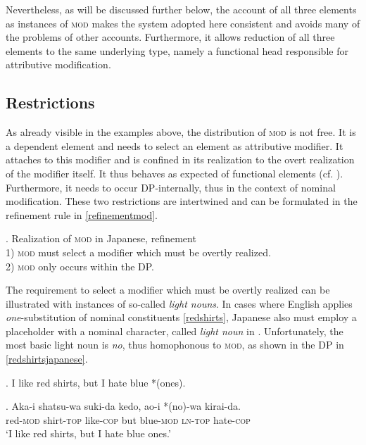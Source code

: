 Nevertheless, as will be discussed further below, the account of all three elements as instances of \textsc{mod} makes the system adopted here consistent and avoids many of the problems of other accounts. Furthermore, it allows reduction of all three elements to the same underlying type, namely a functional head responsible for attributive modification.

\subsection{Restrictions}

As already visible in the examples above, the distribution of \textsc{mod} is not free. It is a dependent element and needs to select an element as attributive modifier. It attaches to this modifier and is confined in its realization to the overt realization of the modifier itself. It thus behaves as expected of functional elements (cf. \citealt[§ 2.2.2]{rubin:1994:mod}). Furthermore, it needs to occur DP-internally, thus in the context of nominal modification. These two restrictions are intertwined and can be formulated in the refinement rule in \ref{refinementmod}.

\ex. Realization of \textsc{mod} in Japanese, refinement\\
1) \textsc{mod} must select a modifier which must be overtly realized. \\
2) \textsc{mod} only occurs within the DP. \label{refinementmod}

The requirement to select a modifier which must be overtly realized can be illustrated with instances of so-called \textit{light nouns}. In cases where English applies \textit{one}-substitution of nominal constituents \ref{redshirts}, Japanese also must employ a placeholder with a nominal character, called \textit{light noun} in \citet{hiraiwa:2012:mechanism}. Unfortunately, the most basic light noun is \textit{no}, thus homophonous to \textsc{mod}, as shown in the DP in \ref{redshirtsjapanese}.

\ex. I like red shirts, but I hate blue *(ones). \label{redshirts}

\exg. Aka-i shatsu-wa suki-da kedo, ao-i *(no)-wa kirai-da.\\
red-\textsc{mod} shirt-\textsc{top} like-\textsc{cop} but blue-\textsc{mod} \textsc{ln}-\textsc{top} hate-\textsc{cop}\\
`I like red shirts, but I hate blue ones.’ \label{redshirtsjapanese}

